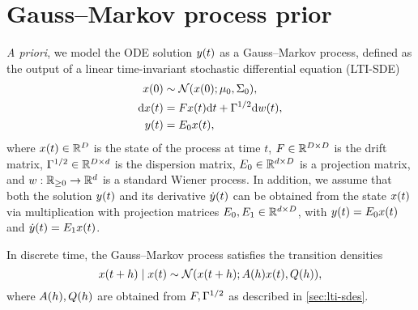 \documentclass{mimosis}
\begin{document}
\section{Gauss--Markov process prior}
\label{sec:orgce0627d}
\label{sec:ode-filters:prior}
\emph{A priori}, we model the ODE solution \(y(t)\) as a Gauss--Markov process, defined as the output of a linear time-invariant stochastic differential equation (LTI-SDE)
\begin{subequations}
\begin{align}
\st(0) &\sim \N( \st(0); \mean{0}, \cov{0} ), \\
\dd \st(t) &= \drift \st(t) \dd t + \disp \dd \wiener(t), \\
\val(t) &= \proj{0} \st(t),
\end{align}
\end{subequations}
where
\(x(t) \in \mathbb{R}^{D}\) is the state of the process at time \(t\),
\(F \in \mathbb{R}^{D \times D}\) is the drift matrix,
\({\Gamma^{1/2} \in \mathbb{R}^{D \times d}}\) is the dispersion matrix,
\(E_{0} \in \mathbb{R}^{d \times D}\) is a projection matrix,
and
\(w: \mathbb{R}_{\geq0} \to \mathbb{R}^{d}\) is a standard Wiener process.
In addition, we assume that both the solution \(y(t)\) and its derivative \(\dot{y}(t)\) can be obtained from the state \(x(t)\) via multiplication with projection matrices \(E_{0}, E_{1} \in \mathbb{R}^{d \times D}\), with \(y(t) = E_{0} x(t)\) and \(\dot{y}(t) = E_{1} x(t)\).

In discrete time, the Gauss--Markov process satisfies the transition densities
\begin{equation}
  \st(t+h) \mid \st(t) \sim \N( \st(t+h); \transA(h) \st(t), \transC(h) ),
\end{equation}
where \(A(h), Q(h)\) are obtained from \(F, \Gamma^{1/2}\) as described in \cref{sec:lti-sdes}.
\end{document}
